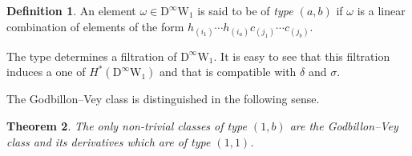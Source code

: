 \documentclass[12pt]{amsart}
\newcommand{\W}{\mathrm{W}}
\newcommand{\D}{\mathrm{D}}
\newtheorem{theorem}{Theorem}[section]
\theoremstyle{definition}
\newtheorem{definition}[theorem]{Definition}
\theoremstyle{remark}
\begin{document}
\begin{definition}
An element $\omega\in\D^\infty\W_1$ is said to be of \textit{type $(a,b)$} if $\omega$ is a linear combination of elements of the form $h_{(i_1)}\cdots h_{(i_a)}c_{(j_1)}\cdots c_{(j_b)}$.
\end{definition}

The type determines a filtration of $\D^\infty\W_1$.
It is easy to see that this filtration induces a one of $H^*(\D^\infty\W_1)$ and that is compatible with $\delta$ and $\sigma$.

The Godbillon--Vey class is distinguished in the following sense.

\begin{theorem}
\label{thm10.3}
The only non-trivial classes of type $(1,b)$ are the Godbillon--Vey class and its derivatives which are of type $(1,1)$.
\end{theorem}
\end{document}
